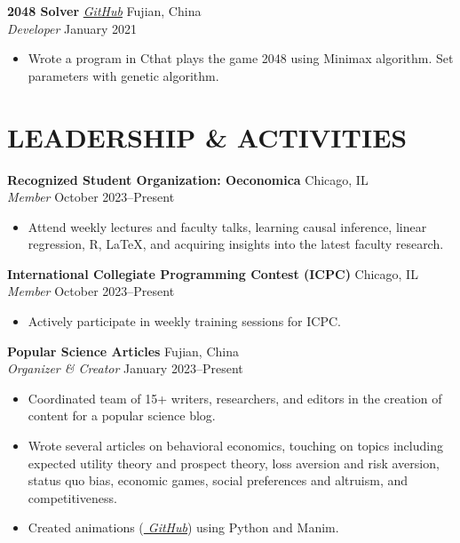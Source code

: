 \documentclass[letterpaper, 9pt]{extarticle}
\newcommand{\CPP}{C\nolinebreak\hspace{-.05em}\raisebox{.4ex}{\tiny\bf +}\nolinebreak\hspace{-.10em}\raisebox{.4ex}{\tiny\bf +}}
\begin{document}
\noindent
\textbf{2048 Solver} 
\emph{\href{https://github.com/AdenChen27/2048_solver}{\color{blue} GitHub}}
\hfill Fujian, China \\
\textit{Developer} \hfill January 2021
\begin{itemize}
    \item Wrote a program in \CPP \space that plays the game 2048 using Minimax algorithm. Set parameters with genetic algorithm.
\end{itemize}

\section*{LEADERSHIP \& ACTIVITIES}


\noindent
\textbf{Recognized Student Organization: Oeconomica} 
\hfill Chicago, IL \\
\textit{Member} \hfill October 2023--Present
\begin{itemize}
    \item Attend weekly lectures and faculty talks, learning causal inference, linear regression, R, \LaTeX, and acquiring insights into the latest faculty research.
\end{itemize}

\noindent
\textbf{International Collegiate Programming Contest (ICPC)} 
\hfill Chicago, IL \\
\textit{Member} \hfill October 2023--Present
\begin{itemize}
    \item Actively participate in weekly training sessions for ICPC.
\end{itemize}


\noindent
\textbf{Popular Science Articles} 
\hfill Fujian, China \\
\textit{Organizer \& Creator} \hfill January 2023--Present
\begin{itemize}
    \item Coordinated team of 15+ writers, researchers, and editors in the creation of content for a popular science blog.
    \item Wrote several articles on behavioral economics, touching on topics including expected utility theory and prospect theory, loss aversion and risk aversion, status quo bias, economic games, social preferences and altruism, and competitiveness. 
    \item Created animations (\emph{\href{https://github.com/AdenChen27/Econic}{\color{blue} GitHub}}) using Python and Manim.
\end{itemize}
\end{document}
